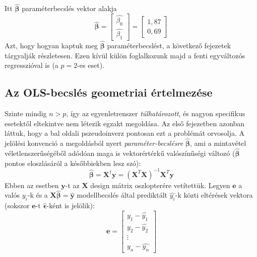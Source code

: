 \documentclass[14p]{report}
\def\pmb{\boldsymbol}
\def\ebeta{\hat{\pmb{\beta}}}
\def\e{\epsilon}
\begin{document}
\begin{center}
\end{center}
Itt $\ebeta$ paraméterbecslés vektor alakja
\[
	\ebeta = 
	\begin{bmatrix}
	\hat{\beta_0} \\
	\hat{\beta_1}
	\end{bmatrix}
	=
	\begin{bmatrix}
	1,87 \\
	0,69
	\end{bmatrix}
\]
Azt, hogy hogyan kaptuk meg $\ebeta$ paraméterbecslést, a következő fejezetek tárgyalják részletesen. Ezen kívül külön foglalkozunk majd a fenti egyváltozós regresszióval is (a $p=2$-es eset).

\subsection{Az OLS-becslés geometriai értelmezése}
Szinte mindig $n > p$, így az egyenletrenszer \emph{túlhatározott}, és nagyon specifikus esetektől eltekintve nem létezik egzakt megoldása. Az első fejezetben azonban láttuk, hogy a bal oldali pszeudoinverz pontosan ezt a problémát orvosolja. A jelölési konvenció a megoldásból nyert \emph{paraméter-becslésre} $\ebeta$, ami a mintavétel véletlenszerűségéből adódóan maga is vektorértérkű valószínűségi változó ($\ebeta$ pontos eloszlásáról a későbbiekben lesz szó):
\[
	\ebeta = \pmb{X}^{\dagger}\pmb{y} = (\pmb{X}^T\pmb{X})^{-1}\pmb{X}^T\pmb{y}
\]
Ebben az esetben $\pmb{y}$-t az $\pmb{X}$ design mátrix oszlopterére vetítettük. Legyen 
$\pmb{e}$ a valós $y_i$-k és a $\pmb{X}\ebeta = \hat{\pmb{y}}$ modellbecslés által prediktált $\hat{y_i}$-k közti eltérések vektora (sokszor $\pmb{e}$-t $\widehat{\pmb{\e}}$-ként is jelölik):
\[
	\pmb{e} =
	\begin{bmatrix}
		y_1 - \hat{y_1} \\
		y_2  - \hat{y_2} \\
		\vdots \\
		y_n - \hat{y_n}
	\end{bmatrix}
\]
\end{document}
